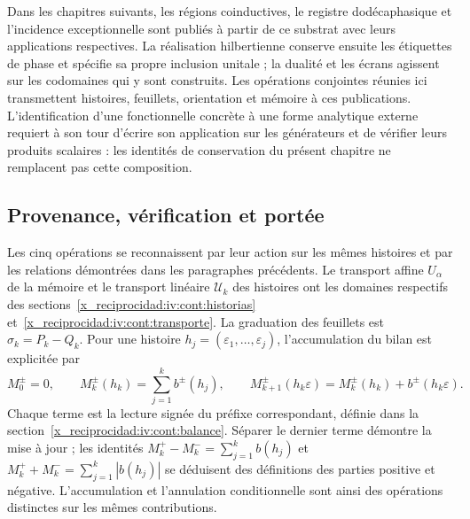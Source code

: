 Dans les chapitres suivants, les régions coinductives, le registre dodécaphasique et l’incidence exceptionnelle sont publiés à partir de ce substrat avec leurs applications respectives. La réalisation hilbertienne conserve ensuite les étiquettes de phase et spécifie sa propre inclusion unitale ; la dualité et les écrans agissent sur les codomaines qui y sont construits. Les opérations conjointes réunies ici transmettent histoires, feuillets, orientation et mémoire à ces publications. L’identification d’une fonctionnelle concrète à une forme analytique externe requiert à son tour d’écrire son application sur les générateurs et de vérifier leurs produits scalaires : les identités de conservation du présent chapitre ne remplacent pas cette composition.

\subsection{Provenance, vérification et portée}
\label{x_reciprocidad:iv:cont:mapa-correlativo}
Les cinq opérations se reconnaissent par leur action sur les mêmes
histoires et par les relations démontrées dans les paragraphes précédents.
Le transport affine \(U_\alpha\) de la mémoire et le transport
linéaire \(\mathcal U_k\) des histoires ont les domaines
respectifs des sections~\ref{x_reciprocidad:iv:cont:historias}
et~\ref{x_reciprocidad:iv:cont:transporte}. La graduation des feuillets est
\(\sigma_k=P_k-Q_k\). Pour une histoire
\(h_j=(\varepsilon_1,\ldots,\varepsilon_j)\), l’accumulation du
bilan est explicitée par
\[
 M_0^\pm=0,\qquad
 M_k^\pm(h_k)=\sum_{j=1}^k b^\pm(h_j),\qquad
 M_{k+1}^\pm(h_k\varepsilon)
 =M_k^\pm(h_k)+b^\pm(h_k\varepsilon).
\]
Chaque terme est la lecture signée du préfixe correspondant, définie dans la section~\ref{x_reciprocidad:iv:cont:balance}. Séparer le dernier terme démontre la mise à jour ; les identités \(M_k^+-M_k^-=\sum_{j=1}^kb(h_j)\) et \(M_k^++M_k^-=\sum_{j=1}^k|b(h_j)|\) se déduisent des définitions des parties positive et négative. L'accumulation et l'annulation conditionnelle sont ainsi des opérations distinctes sur les mêmes contributions.

